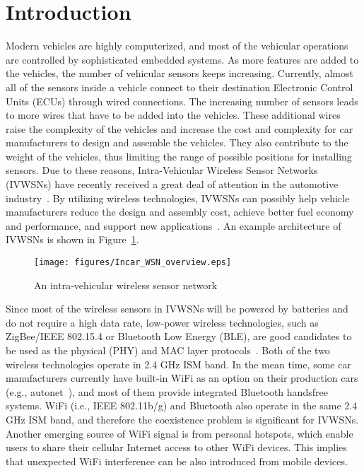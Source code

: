 \documentclass[journal]{IEEEtran}
\begin{document}
\section{Introduction}
Modern vehicles are highly computerized, and most of the vehicular operations are controlled by sophisticated embedded systems. As more features are added to the vehicles, the number of vehicular sensors keeps increasing. Currently, almost all of the sensors inside a vehicle connect to their destination Electronic Control Units (ECUs) through wired connections. The increasing number of sensors leads to more wires that have to be added into the vehicles. These additional wires raise the complexity of the vehicles and increase the cost and complexity for car manufacturers to design and assemble the vehicles. They also contribute to the weight of the vehicles, thus limiting the range of possible positions for installing sensors. 
Due to these reasons, Intra-Vehicular Wireless Sensor Networks (IVWSNs) have recently received a great deal of attention in the automotive industry~\cite{GM-intra-vehicular}. By utilizing wireless technologies, IVWSNs can possibly help vehicle manufacturers reduce the design and assembly cost, achieve better fuel economy and performance, and support new applications~\cite{JRVTC2011}. An example architecture of IVWSNs is shown in Figure~\ref{SampleWSN}.

\begin{figure}[tbp]
\centering
\texttt{[image: figures/Incar\_WSN\_overview.eps]}
\caption{An intra-vehicular wireless sensor network}
\label{SampleWSN}
\end{figure}

Since most of the wireless sensors in IVWSNs will be powered by batteries and do not require a high data rate, low-power wireless technologies, such as ZigBee/IEEE 802.15.4 or Bluetooth Low Energy (BLE), are good candidates to be used as the physical (PHY) and MAC layer protocols~\cite{ZigBee-based-WSN}\cite{2012JR_BLE_Tech}. Both of the two wireless technologies operate in 2.4 GHz ISM band. In the mean time, some car manufacturers currently have built-in WiFi as an option on their production cars (e.g., autonet~\cite{autonet}), and most of them provide integrated Bluetooth handsfree systems. WiFi (i.e., IEEE 802.11b/g) and Bluetooth also operate in the same 2.4 GHz ISM band, and therefore the coexistence problem is significant for IVWSNs. Another emerging source of WiFi signal is from personal hotspots, which enable users to share their cellular Internet access to other WiFi devices. This implies that unexpected WiFi interference can be also introduced from mobile devices.
\end{document}
